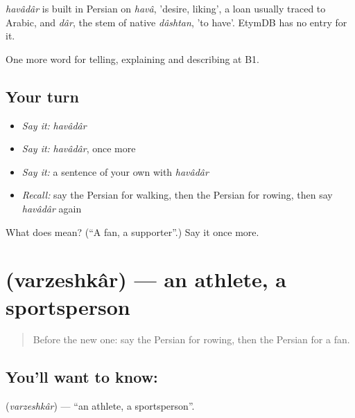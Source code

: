 \begin{cousinweb}
\emph{havâdâr} is built in Persian on \emph{havâ}, 'desire, liking', a loan usually traced to Arabic, and \emph{dâr}, the stem of native \emph{dâshtan}, 'to have'. EtymDB has no entry for it.
\end{cousinweb}

\begin{grammarlens}[title={What you've built}]
One more word for telling, explaining and describing at B1.
\end{grammarlens}

\subsection*{Your turn}
\begin{itemize}
\raggedright
  \item \emph{Say it:} \emph{havâdâr}
  \item \emph{Say it:} \emph{havâdâr}, once more
  \item \emph{Say it:} a sentence of your own with \emph{havâdâr}
  \item \emph{Recall:} say the Persian for walking, then the Persian for rowing, then say \emph{havâdâr} again
\end{itemize}

\begin{tcolorbox}[breakable,colback=teal!4,colframe=teal!35!black,title={Before you move on}]
What does  mean? (\textquotedblleft{}A fan, a supporter\textquotedblright{}.) Say it once more.
\end{tcolorbox}
\section[\texorpdfstring{\fa{ورزشکار} (varzeshkâr)}{ورزشکار (varzeshkâr)}]{ (varzeshkâr) — an athlete, a sportsperson}

\label{lesson:FA-C512-varzeshkar}



\begin{quote}
Before the new one: say the Persian for rowing, then the Persian for a fan.
\end{quote}

\subsection*{You'll want to know: }
\textbf{} (\emph{varzeshkâr}) — \textquotedblleft{}an athlete, a sportsperson\textquotedblright{}.

